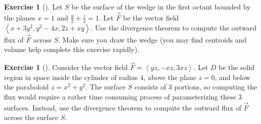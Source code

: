 \documentclass[10pt,]{book}
\theoremstyle{plain}
\theoremstyle{definition}
\theoremstyle{definition}
\theoremstyle{definition}
\theoremstyle{definition}
\newtheorem{exploration}[project]{Exercise}
\theoremstyle{definition}
\numberwithin{equation}{section}
\newcommand{\ds}{\displaystyle}
\newcommand{\lt}{<}
\begin{document}
\begin{exploration}[]\label{exploration-311}
Let \(S\) be the surface of the wedge in the first octant bounded by the planes \(x=1\) and \(\ds\frac{y}{2}+\frac{z}{3}=1\). Let \(\vec F\) be the vector field \(\left\lt x+3y^2,y^2-4x,2z+xy\right>\). Use the divergence theorem to compute the outward flux of \(\vec F\) across \(S\). Make sure you draw the wedge (you may find centroids and volume help complete this exercise rapidly).%
\end{exploration}
\begin{exploration}[]\label{exploration-312}
Consider the vector field \(\vec F = \left\lt yz,-xz,3xz\right>\). Let \(D\) be the solid region in space inside the cylinder of radius 4, above the plane \(z=0\), and below the paraboloid \(z=x^2+y^2\). The surface \(S\) consists of 3 portions, so computing the flux would require a rather time consuming process of parameterizing these 3 surfaces. Instead, use the divergence theorem to compute the outward flux of \(\vec F\) across the surface \(S\).%
\end{exploration}
%
\backmatter
%
%
%
\end{document}
